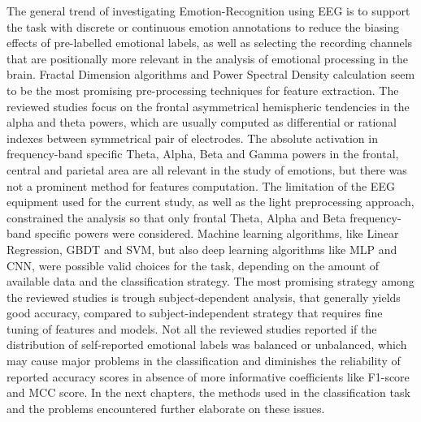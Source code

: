 The general trend of investigating Emotion-Recognition using \ac{EEG} is to support the task with discrete or continuous emotion annotations to reduce the biasing effects of pre-labelled emotional labels, as well as selecting the recording channels that are positionally more relevant in the analysis of emotional processing in the brain. Fractal Dimension algorithms and Power Spectral Density calculation seem to be the most promising pre-processing techniques for feature extraction. The reviewed studies focus on the frontal asymmetrical hemispheric tendencies in the alpha and theta powers, which are usually computed as differential or rational indexes between symmetrical pair of electrodes. The absolute activation in frequency-band specific Theta, Alpha, Beta and Gamma powers in the frontal, central and parietal area are all relevant in the study of emotions, but there was not a prominent method for features computation. The limitation of the \ac{EEG} equipment used for the current study, as well as the light preprocessing approach, constrained the analysis so that only frontal Theta, Alpha and Beta frequency-band specific powers were considered. Machine learning algorithms, like Linear Regression, \ac{GBDT} and \ac{SVM}, but also deep learning algorithms like \ac{MLP} and \ac{CNN}, were possible valid choices for the task, depending on the amount of available data and the classification strategy. The most promising strategy among the reviewed studies is trough subject-dependent analysis, that generally yields good accuracy, compared to subject-independent strategy that requires fine tuning of features and models. Not all the reviewed studies reported if the distribution of self-reported emotional labels was balanced or unbalanced, which may cause major problems in the classification and diminishes the reliability of reported accuracy scores in absence of more informative coefficients like F1-score and \ac{MCC} score. In the next chapters, the methods used in the classification task and the problems encountered further elaborate on these issues.





